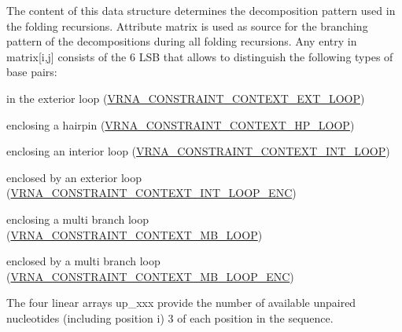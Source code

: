 The content of this data structure determines the decomposition pattern used in the folding recursions. Attribute \textquotesingle{}matrix\textquotesingle{} is used as source for the branching pattern of the decompositions during all folding recursions. Any entry in matrix\mbox{[}i,j\mbox{]} consists of the 6 L\+S\+B that allows to distinguish the following types of base pairs\+:
\begin{DoxyItemize}
\item in the exterior loop (\hyperlink{group__hard__constraints_ga9418eda62a5dec070896702c279d2548}{V\+R\+N\+A\+\_\+\+C\+O\+N\+S\+T\+R\+A\+I\+N\+T\+\_\+\+C\+O\+N\+T\+E\+X\+T\+\_\+\+E\+X\+T\+\_\+\+L\+O\+O\+P})
\item enclosing a hairpin (\hyperlink{group__hard__constraints_ga79203702b197b6b9d3b78eed40663eb1}{V\+R\+N\+A\+\_\+\+C\+O\+N\+S\+T\+R\+A\+I\+N\+T\+\_\+\+C\+O\+N\+T\+E\+X\+T\+\_\+\+H\+P\+\_\+\+L\+O\+O\+P})
\item enclosing an interior loop (\hyperlink{group__hard__constraints_ga21feeab3a9e5fa5a9e3d9ac0fcf5994f}{V\+R\+N\+A\+\_\+\+C\+O\+N\+S\+T\+R\+A\+I\+N\+T\+\_\+\+C\+O\+N\+T\+E\+X\+T\+\_\+\+I\+N\+T\+\_\+\+L\+O\+O\+P})
\item enclosed by an exterior loop (\hyperlink{group__hard__constraints_ga0536288e04ff6332ecdc23ca4705402b}{V\+R\+N\+A\+\_\+\+C\+O\+N\+S\+T\+R\+A\+I\+N\+T\+\_\+\+C\+O\+N\+T\+E\+X\+T\+\_\+\+I\+N\+T\+\_\+\+L\+O\+O\+P\+\_\+\+E\+N\+C})
\item enclosing a multi branch loop (\hyperlink{group__hard__constraints_ga456ecd2ff00056bb64da8dd4f61bbfc5}{V\+R\+N\+A\+\_\+\+C\+O\+N\+S\+T\+R\+A\+I\+N\+T\+\_\+\+C\+O\+N\+T\+E\+X\+T\+\_\+\+M\+B\+\_\+\+L\+O\+O\+P})
\item enclosed by a multi branch loop (\hyperlink{group__hard__constraints_ga02a3d703ddbcfce393e4bbfcb9db7077}{V\+R\+N\+A\+\_\+\+C\+O\+N\+S\+T\+R\+A\+I\+N\+T\+\_\+\+C\+O\+N\+T\+E\+X\+T\+\_\+\+M\+B\+\_\+\+L\+O\+O\+P\+\_\+\+E\+N\+C})
\end{DoxyItemize}

The four linear arrays \textquotesingle{}up\+\_\+xxx\textquotesingle{} provide the number of available unpaired nucleotides (including position i) 3\textquotesingle{} of each position in the sequence.

